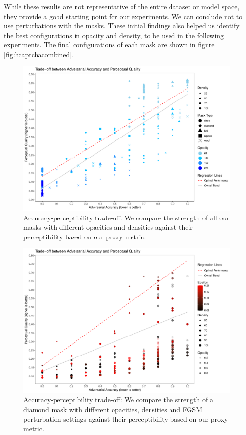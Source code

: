 \documentclass[a4paper, oneside]{discothesis}
\begin{document}
While these results are not representative of the entire dataset or model space, they provide a good starting point for our experiments. We can conclude not to use perturbations with the masks. These initial findings also helped us identify the best configurations in opacity and density, to be used in the following experiments. The final configurations of each mask are shown in figure \ref{fig:hcaptchacombined}.

\begin{figure}
	\centering
	\includegraphics[width=1\columnwidth]{figures/eval_cls_mask_density.pdf}
	\caption{Accuracy-perceptibility trade-off: We compare the strength of all our masks with different opacities and densities against their perceptibility based on our proxy metric.}
	\label{fig:tradeoff-1}
\end{figure}

\begin{figure}
	\centering
	\includegraphics[width=1\columnwidth]{figures/eval_cls_perturb.pdf}
	\caption{Accuracy-perceptibility trade-off: We compare the strength of a diamond mask with different opacities, densities and FGSM perturbation settings against their perceptibility based on our proxy metric.}
	\label{fig:tradeoff-2}
\end{figure}
\end{document}
